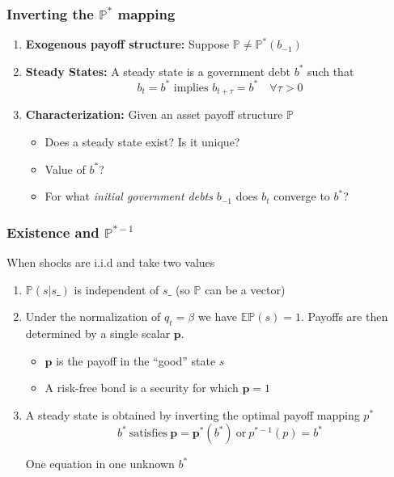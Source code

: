 \documentclass{beamer}
\begin{document}
%
\begin{frame}
	\frametitle{Inverting the $\mathbb{P}^*$ mapping}
	\begin{enumerate}
		\item  \textbf{Exogenous payoff structure:} Suppose $\mathbb{P}\neq \mathbb{P}^*(b_{-1})$
		
		\item \textbf{Steady States: } A steady state is a government debt   $b^*$ such that
		\[b_{t}=b^* \text{ implies } b_{t+\tau}=b^*\quad \forall \tau >0\]
	
			
		\item \textbf{Characterization: } Given an asset payoff structure $\mathbb{P}$
		\begin{itemize}
			\item Does a steady state exist? Is it unique?
			\item Value of $b^*$?
			\item For what   \emph{initial government debts} $b_{-1}$ does  $b_t$ converge to $b^*$?
 			\end{itemize}
	\end{enumerate}
\end{frame}



 \begin{frame}
  \frametitle{Existence and $\mathbb{P}^{* -1}$}


 When shocks are i.i.d and take two values

  \begin{enumerate}

\item $\mathbb{P}(s|s\_)$ is independent of $s\_$ (so $\mathbb{P}$ can be a vector)
\item Under the normalization of $q_t = \beta$ we have $\mathbb{E}\mathbb{P}(s)=1$.   Payoffs are then determined by a single scalar $\bm{p}$.
\begin{itemize}
 \item $\bm{p}$ is the payoff in the ``good'' state $s$
 \item A risk-free bond is a security for which $\bm{p}=1$
\end{itemize}

\item A steady state is obtained by inverting the optimal payoff mapping $p^*$
\begin{equation*}
\label{eq-ss}
b^* \ \textrm{satisfies} \  \bm{p}=\bm{p}^*(b^*) \ \textrm{or} \ p^{* -1}(p) = b^*
\end{equation*}

One equation in one unknown $b^*$
\end{enumerate}
\end{frame}
\end{document}
